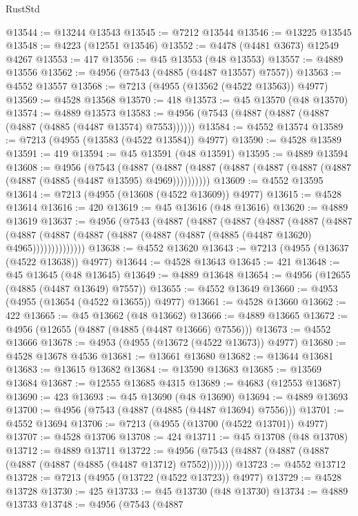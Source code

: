 \begin{lexlean}{RustStd}
\begin{coremodule}
@13544 := @13244 @13543
@13545 := @7212 @13544
@13546 := @13225 @13545
@13548 := @4223 (@12551 @13546)
@13552 := @4478 (@4481 @3673) @12549 @4267
@13553 := 417
@13556 := @45 @13553 (@48 @13553)
@13557 := @4889 @13556
@13562 := @4956 (@7543 (@4885 (@4487 @13557) @7557))
@13563 := @4552 @13557
@13568 := @7213 (@4955 (@13562 (@4522 @13563)) @4977)
@13569 := @4528 @13568
@13570 := 418
@13573 := @45 @13570 (@48 @13570)
@13574 := @4889 @13573
@13583 := @4956 (@7543 (@4887 (@4887 (@4887 (@4887 (@4885 (@4487 @13574) @7553))))))
@13584 := @4552 @13574
@13589 := @7213 (@4955 (@13583 (@4522 @13584)) @4977)
@13590 := @4528 @13589
@13591 := 419
@13594 := @45 @13591 (@48 @13591)
@13595 := @4889 @13594
@13608 := @4956
    (@7543
      (@4887 (@4887 (@4887 (@4887 (@4887 (@4887 (@4887 (@4887 (@4885 (@4487 @13595) @4969))))))))))
@13609 := @4552 @13595
@13614 := @7213 (@4955 (@13608 (@4522 @13609)) @4977)
@13615 := @4528 @13614
@13616 := 420
@13619 := @45 @13616 (@48 @13616)
@13620 := @4889 @13619
@13637 := @4956
    (@7543
      (@4887
        (@4887
          (@4887
            (@4887
              (@4887
                (@4887
                  (@4887
                    (@4887 (@4887 (@4887 (@4887 (@4887 (@4885 (@4487 @13620) @4965))))))))))))))
@13638 := @4552 @13620
@13643 := @7213 (@4955 (@13637 (@4522 @13638)) @4977)
@13644 := @4528 @13643
@13645 := 421
@13648 := @45 @13645 (@48 @13645)
@13649 := @4889 @13648
@13654 := @4956 (@12655 (@4885 (@4487 @13649) @7557))
@13655 := @4552 @13649
@13660 := @4953 (@4955 (@13654 (@4522 @13655)) @4977)
@13661 := @4528 @13660
@13662 := 422
@13665 := @45 @13662 (@48 @13662)
@13666 := @4889 @13665
@13672 := @4956 (@12655 (@4887 (@4885 (@4487 @13666) @7556)))
@13673 := @4552 @13666
@13678 := @4953 (@4955 (@13672 (@4522 @13673)) @4977)
@13680 := @4528 @13678 @4536
@13681 := @13661 @13680
@13682 := @13644 @13681
@13683 := @13615 @13682
@13684 := @13590 @13683
@13685 := @13569 @13684
@13687 := @12555 @13685 @4315
@13689 := @4683 (@12553 @13687)
@13690 := 423
@13693 := @45 @13690 (@48 @13690)
@13694 := @4889 @13693
@13700 := @4956 (@7543 (@4887 (@4885 (@4487 @13694) @7556)))
@13701 := @4552 @13694
@13706 := @7213 (@4955 (@13700 (@4522 @13701)) @4977)
@13707 := @4528 @13706
@13708 := 424
@13711 := @45 @13708 (@48 @13708)
@13712 := @4889 @13711
@13722 := @4956 (@7543 (@4887 (@4887 (@4887 (@4887 (@4887 (@4885 (@4487 @13712) @7552)))))))
@13723 := @4552 @13712
@13728 := @7213 (@4955 (@13722 (@4522 @13723)) @4977)
@13729 := @4528 @13728
@13730 := 425
@13733 := @45 @13730 (@48 @13730)
@13734 := @4889 @13733
@13748 := @4956
    (@7543
      (@4887

\end{coremodule}
\end{lexlean}
